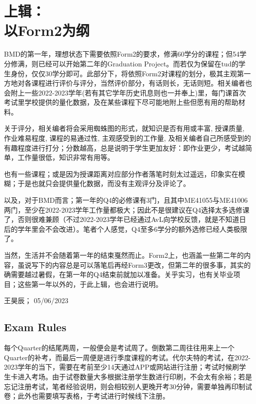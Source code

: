 \chapter[上辑：以Form2为纲]{上辑：\\以Form2为纲}
BMD的第一年，理想状态下需要依照Form2的要求，修满60学分的课程；但54学分修满，则已经可以开始第二年的Graduation Project。而若仅为保留在tud的学生身份，仅仅30学分即可。此部分下，将依照Form2对课程的划分，极其主观第一方地对各课程进行评价与评分，当然评价部分，有话则长，无话则短。相关编者也会附上一些2022-2023学年(若有其它学年历史讯息则也一并奉上)里，每门课首次考试里学校提供的量化数据，及在某些课程下尽可能地附上些但愿有用的帮助材料。

关于评分，相关编者将会采用蜘蛛图的形式，就知识是否有用或丰富, 授课质量, 作业难易程度, 课程的易通过性, 主观感受到的工作量, 及相关编者自己所感受到的有趣程度进行打分；分数越高，总是说明于学生更加友好：即作业更少，考试越简单，工作量很低，知识非常有用等。

也有一些课程；或是因为授课距离对应部分作者落笔时刻太过遥远，印象实在模糊；于是也就只会提供量化数据，而没有主观评分及评论了。

以及，对于BMD而言；第一年的Q4的必修课有3门，且其中ME41055与ME41006两门，至少在2022-2023学年工作量都极大；因此不是很建议在Q4选择太多选修课了，否则很难兼顾（不过2022-2023学年已经通过AvL向学校反馈，就是不知道日后的学年里会不会改进）。笔者个人感觉，Q4至多6学分的额外选修已经人类极限了。

当然，生活并不会随着第一年的结束戛然而止。Form2上，也涵盖一些第二年的内容，虽说写下的内容总是可以落笔后再经Form3更改，但第二年的很多事，其实的确需要越过暑假，在第一年的Q4结束前就加以准备。关乎实习，也有关毕业项目；这些第一年以外的，于此上辑，也会进行说明。
\begin{flushright}
王昊辰； 05/06/2023
\end{flushright}








\section{Exam Rules}
每个Quarter的结尾两周，一般便会是考试周了。倒数第二周往往用来上一个Quarter的补考，而最后一周便是进行季度课程的考试。代尔夫特的考试，在2022-2023学年的当下，需要在考前至少14天通过APP或网站进行注册；考试时候刷学生卡进入考场。由于试卷数量大多根据注册学生数进行印刷，不会太有余裕；若是忘记注册考试，笔者经验说明，则会相较别人更晚开考30分钟，需要单独再印制试卷；此外也需要填写表格，于考试进行时候线下注册。

